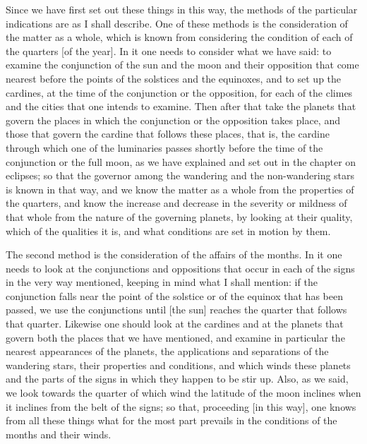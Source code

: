 \documentclass[11pt]{article}
\newcommand{\Fol}[1]{\marginpar{\footnotesize\color{gray}f.\,#1}}
\begin{document}
\par Since we have first set out these things in this way, the methods of the particular indications are as I shall describe. One of these methods is the consideration of the matter as a whole, which is known from considering the condition of each of the quarters [of the year]. In it one needs to consider what we have said: to examine the conjunction of the sun and the moon and their opposition that come nearest before the points of the solstices and the equinoxes, and to set up the cardines, at the time of the conjunction or the opposition, for each of the climes and the cities that one intends to examine. Then after that take the planets that govern the places in which the conjunction or the opposition takes place, and those that govern the cardine that follows these places, that is, the cardine through which one of the luminaries passes shortly before the time of the conjunction or the full moon, as we have explained and set out in the chapter on eclipses; so that the governor among the wandering and the non-wandering stars is known in that way, and we know the matter as a whole from the properties of the quarters, and know the increase and decrease in the severity or mildness of that whole from the nature of the governing planets, by looking at their quality, which of the qualities it is, and what conditions are set in motion by them.\par
\par \Fol{33r}The second method is the consideration of the affairs of the months. In it one needs to look at the conjunctions and oppositions that occur in each of the signs in the very way mentioned, keeping in mind what I shall mention: if the conjunction falls near the point of the solstice or of the equinox that has been passed, we use the conjunctions until [the sun] reaches the quarter that follows that quarter. Likewise one should look at the cardines and at the planets that govern both the places that we have mentioned, and examine in particular the nearest appearances of the planets, the applications and separations of the wandering stars, their properties and conditions, and which winds these planets and the parts of the signs in which they happen to be stir up. Also, as we said, we look towards the quarter of which wind the latitude of the moon inclines when it inclines from the belt of the signs; so that, proceeding [in this way], one knows from all these things what for the most part prevails in the conditions of the months and their winds.\par
\end{document}

